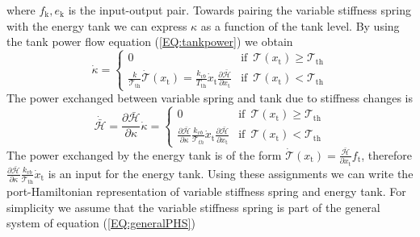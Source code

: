 \documentclass[a4paper,twoside, openright,12pt]{report}
\newcommand{\g}[1]{\text{#1}}
\begin{document}
where $f_\g{k},e_\g{k}$ is the input-output pair. Towards pairing the variable stiffness spring with the energy tank we can express $\kappa$ as a function of the tank level. By using the tank power flow equation (\ref{EQ:tankpower}) we obtain
\begin{equation}
\dot{\kappa} = \begin{cases}
0 & \text{if } \, \mathcal{T}(x_\g{t})\geq \mathcal{T}_{\g{th}} \\
\frac{k}{\mathcal{T}_{\g{th}}}\dot{\mathcal{T}}(x_\g{t}) = \frac{k_{vb}}{T_{\g{th}}} \dot{x}_\g{t} \frac{\partial \bar{\mathcal{H}}}{\partial x_\g{t}} & \text{if }  \, \mathcal{T}(x_\g{t}) < \mathcal{T}_{\g{th}}
\end{cases}
\end{equation}
The power exchanged between variable spring and tank due to stiffness changes is
\begin{equation}
\dot{\bar{\mathcal{H}}} = \frac{\partial \bar{\mathcal{H}}}{\partial \kappa}\dot{\kappa} =
\begin{cases}
0 & \text{if } \, \mathcal{T}(x_\g{t})\geq \mathcal{T}_{\g{th}} \\
\frac{\partial \bar{\mathcal{H}}}{\partial \kappa}\frac{k_{vb}}{\mathcal{T}_{th}} \dot{x}_\g{t} \frac{\partial \bar{\mathcal{H}}}{\partial x_\g{t}} & \text{if }  \, \mathcal{T}(x_\g{t}) < \mathcal{T}_{\g{th}}
\end{cases}
\end{equation}
The power exchanged by the energy tank is of the form $\dot{\mathcal{T}}(x_\g{t}) = \frac{\bar{\mathcal{H}}}{\partial x_\g{t}}f_\g{t}$, therefore $\frac{\partial \bar{\mathcal{H}}}{\partial \kappa}\frac{k_{vb}}{\mathcal{T}_{\g{th}}} \dot{x}_\g{t}$ is an input for the energy tank. Using these assignments we can write the port-Hamiltonian representation of variable stiffness spring and energy tank. For simplicity we assume that the variable stiffness spring is part of the general system of equation (\ref{EQ:generalPHS})
\end{document}
